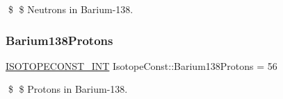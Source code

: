 \$ \$ Neutrons in Barium-\/138. \mbox{\label{group___isotope_const-_barium-_ba138_gaaba6b417c584d58595526b19c538ecae}} 
\subsubsection{\texorpdfstring{Barium138\+Protons}{Barium138Protons}}
{\footnotesize\ttfamily \mbox{\hyperlink{group___isotope_const-_macros_ga5f18360b3e99483a35c32d789e62621c}{I\+S\+O\+T\+O\+P\+E\+C\+O\+N\+S\+T\+\_\+\+I\+NT}} Isotope\+Const\+::\+Barium138\+Protons = 56}

\$ \$ Protons in Barium-\/138. 